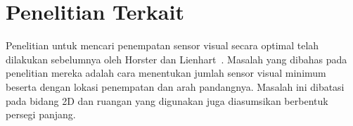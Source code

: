 %
%
%
%
%
%
%

\section{Penelitian Terkait}
Penelitian untuk mencari penempatan sensor visual secara optimal telah dilakukan sebelumnya oleh Horster dan Lienhart~\cite{horster2006approximating}. Masalah yang dibahas pada penelitian mereka adalah cara menentukan jumlah sensor visual minimum beserta dengan lokasi penempatan dan arah pandangnya. Masalah ini dibatasi pada bidang 2D dan ruangan yang digunakan juga diasumsikan berbentuk persegi panjang.

